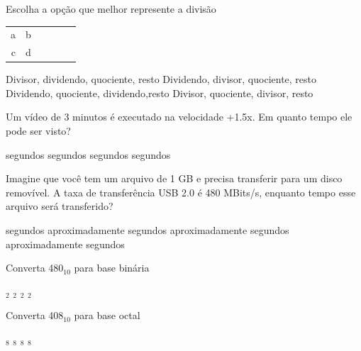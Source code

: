 \documentclass[12pt]{exam}
\begin{document}
\noindent
%
\begin{questions}
\question Escolha a opção que melhor represente a divisão

\begin{center} 
\begin{tabular}{rrrrrr}
a & \multicolumn{1}{|r}{b} & & & & \\\cline{2-2}
c & d 
\end{tabular}
\end{center}
\begin{multicols}{2}
\begin{checkboxes}
\choice Divisor, dividendo, quociente, resto
\choice Dividendo, divisor, quociente, resto
\choice Dividendo, quociente, dividendo,resto
\choice Divisor, quociente, divisor, resto
\end{checkboxes}
\end{multicols}
\question Um vídeo de 3 minutos é executado na velocidade +1.5x. Em quanto tempo ele pode ser visto?
\begin{multicols}{2}
\begin{checkboxes}
     segundos     segundos      segundos      segundos
\end{checkboxes}
\end{multicols}

\question Imagine que você tem um arquivo de 1 GB e precisa transferir para um disco removível. A taxa de transferência USB 2.0 é 480 MBits/s, enquanto tempo esse arquivo será transferido?
\begin{multicols}{2}
\begin{checkboxes}
     segundos aproximadamente
     segundos aproximadamente
     segundos aproximadamente
     segundos
\end{checkboxes}
\end{multicols}

\question Converta 480$_{10}$ para base binária
\begin{multicols}{2}
\begin{checkboxes}

    $_{2}$
    $_{2}$
    $_{2}$
    $_{2}$
\end{checkboxes} 
\end{multicols}

\question Converta 408$_{10}$ para base octal
\begin{multicols}{2}
\begin{checkboxes}
	 $_{8}$
	 $_{8}$
	 $_{8}$
	 $_{8}$
\end{checkboxes}
\end{multicols}


\end{questions}
\end{document}
